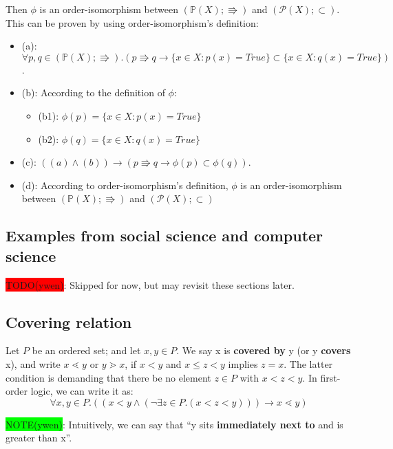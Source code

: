 \documentclass[12pt, letterpaper, oneside]{book}
\begin{document}
Then $\phi$ is an order-isomorphism between $(\mathbb{P}(X); \Rrightarrow)$ and $(\mathcal{P}(X); \subset)$. This can
be proven by using order-isomorphism's definition:
\begin{itemize}
  \item (a): $\forall p, q \in (\mathbb{P}(X); \Rrightarrow). (p \Rrightarrow q \rightarrow \{x \in X: p(x) = True\}
          \subset \{x \in X: q(x) = True\})$.
  \item (b): According to the definition of $\phi$:
        \begin{itemize}
          \item (b1): $\phi(p) = \{x \in X: p(x) = True\}$
          \item (b2): $\phi(q) = \{x \in X: q(x) = True\}$
        \end{itemize}
  \item (c): $((a) \land (b)) \rightarrow (p \Rrightarrow q \rightarrow \phi(p) \subset \phi(q))$.
  \item (d): According to order-isomorphism's definition, $\phi$ is an order-isomorphism between $(\mathbb{P}(X);
          \Rrightarrow)$ and $(\mathcal{P}(X); \subset)$
\end{itemize}

\subsection{Examples from social science and computer science}

\colorbox{red}{TODO(ywen)}: Skipped for now, but may revisit these sections later.

\subsection{Covering relation}

Let $P$ be an ordered set; and let $x, y \in P$. We say x is \textbf{covered by} y (or y \textbf{covers} x), and write
$x \lessdot y$ or $y \gtrdot x$, if $x < y$ and $x \leqslant z < y$ implies $z = x$. The latter condition is demanding
that there be no element $z \in P$ with $x < z < y$. In first-order logic, we can write it as:
\[
  \forall x, y \in P. ((x < y \land (\lnot \exists z \in P. (x < z < y))) \rightarrow x \lessdot y)
\]

\colorbox{lime}{NOTE(ywen)}: Intuitively, we can say that ``y sits \textbf{immediately next to} and is greater than x''.
\end{document}
